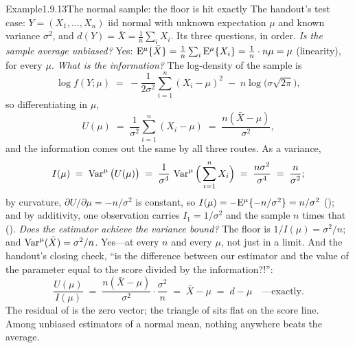 \documentclass[main.tex]{subfiles}
\begin{document}
\begin{ObjL}{Example}{1.9.13}{The normal sample: the floor is hit exactly}
The handout's test case: $Y=(X_1,\dots,X_n)$ iid normal with unknown expectation $\mu$ and
known variance $\sigma^2$, and $d(Y)=\bar X=\frac1n\sum_i X_i$. Its three questions, in
order.
\emph{Is the sample average unbiased?} Yes:
$\mathrm{E}^{\mu}\{\bar X\}=\frac1n\sum_i \mathrm{E}^{\mu}\{X_i\}=\frac1n\cdot n\mu=\mu$ (linearity), for
every $\mu$.
\emph{What is the information?} The log-density of the sample is
\[ \log f(Y;\mu) \;=\; -\frac{1}{2\sigma^2}\sum_{i=1}^n (X_i-\mu)^2
   \;-\; n\log\big(\sigma\sqrt{2\pi}\big) , \]
so differentiating in $\mu$,
\[ U(\mu) \;=\; \frac{1}{\sigma^2}\sum_{i=1}^n (X_i-\mu)
   \;=\; \frac{n(\bar X-\mu)}{\sigma^2} , \]
and the information comes out the same by all three routes. As a variance,
\[ I(\mu) \;=\; \operatorname{Var}^{\mu}\big(U(\mu)\big)
   \;=\; \frac{1}{\sigma^4}\,\operatorname{Var}^{\mu}\Big(\sum_{i=1}^n X_i\Big)
   \;=\; \frac{n\sigma^2}{\sigma^4} \;=\; \frac{n}{\sigma^2} ; \]
by curvature, $\partial U/\partial\mu=-n/\sigma^2$ is constant, so
$I(\mu)=-\mathrm{E}^{\mu}\{-n/\sigma^2\}=n/\sigma^2$ (); and by additivity, one
observation carries $I_1=1/\sigma^2$ and the sample $n$ times that ().
\emph{Does the estimator achieve the variance bound?} The floor is
$1/I(\mu)=\sigma^2/n$; and $\operatorname{Var}^{\mu}(\bar X)=\sigma^2/n$. Yes---at every $n$ and every
$\mu$, not just in a limit.
And the handout's closing check, ``is the difference between our estimator and the value of
the parameter equal to the score divided by the information?!'':
\[ \frac{U(\mu)}{I(\mu)} \;=\; \frac{n(\bar X-\mu)}{\sigma^2}\cdot\frac{\sigma^2}{n}
   \;=\; \bar X - \mu \;=\; d - \mu \quad\text{---exactly.} \]
The residual of  is the zero vector; the triangle of  sits flat on
the score line. Among unbiased estimators of a normal mean, nothing anywhere beats the
average.
\end{ObjL}
\end{document}
